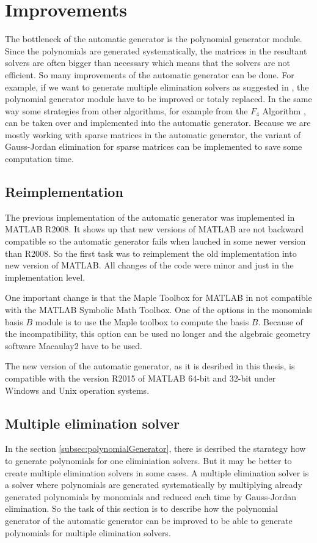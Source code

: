 \section{Improvements}
The bottleneck of the automatic generator is the polynomial generator module. Since the polynomials are generated systematically, the matrices in the resultant solvers are often bigger than necessary which means that the solvers are not efficient. So many improvements of the automatic generator \cite{AutoGen} can be done. For example, if we want to generate multiple elimination solvers as suggested in \cite{KukelovaAlgMethods}, the polynomial generator module have to be improved or totaly replaced. In the same way some strategies from other algorithms, for example from the $F_4$ Algorithm \cite{F4}, can be taken over and implemented into the automatic generator. Because we are mostly working with sparse matrices in the automatic generator, the variant of Gauss-Jordan elimination for sparse matrices can be implemented to save some computation time.

\subsection{Reimplementation}
The previous implementation \cite{AutoGen} of the automatic generator was implemented in MATLAB R2008. It shows up that new versions of MATLAB are not backward compatible so the automatic generator fails when lauched in some newer version than R2008. So the first task was to reimplement the old implementation into new version of MATLAB. All changes of the code were minor and just in the implementation level.

One important change is that the Maple Toolbox for MATLAB in not compatible with the MATLAB Symbolic Math Toolbox. One of the options in the monomials basis $B$ module is to use the Maple toolbox to compute the basis $B$. Because of the incompatibility, this option can be used no longer and the algebraic geometry software Macaulay2 \cite{M2} have to be used.

The new version of the automatic generator, as it is desribed in this thesis, is compatible with the version R2015 of MATLAB 64-bit and 32-bit under Windows and Unix operation systems.

\subsection{Multiple elimination solver}
\label{subsec:multipleSolver}
In the section \ref{subsec:polynomialGenerator}, there is desribed the starategy how to generate polynomials for one eliminiation solvers. But it may be better to create multiple elimination solvers in some cases. A multiple elimination solver is a solver where polynomials are generated systematically by multiplying already generated polynomials by monomials and reduced each time by Gauss-Jordan elimination. So the task of this section is to describe how the polynomial generator of the automatic generator can be improved to be able to generate polynomials for multiple elimination solvers.

